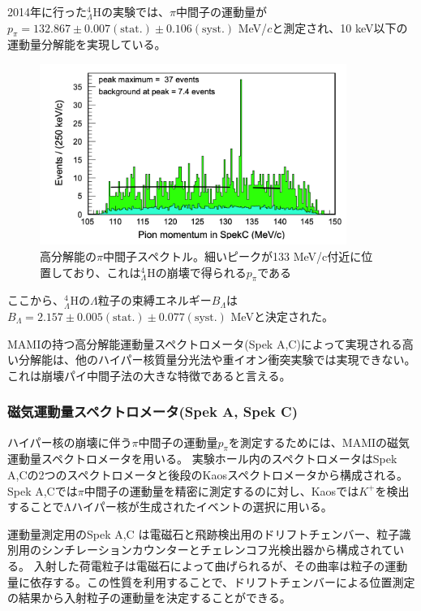 \documentclass[a4paper,11pt,uplatex]{jsbook}
\begin{document}
2014年に行った$^4_{\Lambda}\text{H}$の実験\cite{Schulz2015}では、$\pi$中間子の運動量が
$p_\pi = 132.867 \pm 0.007(\text{stat.}) \pm 0.106(\text{syst.})$ MeV/$c$と測定され、10 keV以下の運動量分解能を実現している。
\begin{figure}[b]
  \centering
  \includegraphics[width=10cm]{image/1-PionSpectrum.png}
  \caption[過去実験での$p_\pi$スペクトル]{高分解能の$\pi$中間子スペクトル。細いピークが133 MeV/c付近に位置しており、これは$^4_{\Lambda}\text{H}$の崩壊で得られる$p_\pi$である\cite{Schulz2015}}
\end{figure}

ここから、$^4_{\Lambda}\text{H}$の$\Lambda$粒子の束縛エネルギー$B_\Lambda$は$B_\Lambda = 2.157 \pm 0.005(\text{stat.}) \pm 0.077(\text{syst.})$ MeVと決定された。

MAMIの持つ高分解能運動量スペクトロメータ(Spek A,C)によって実現される高い分解能は、他のハイパー核質量分光法や重イオン衝突実験では実現できない。
これは崩壊パイ中間子法の大きな特徴であると言える。

\subsubsection{磁気運動量スペクトロメータ(Spek A, Spek C)}
ハイパー核の崩壊に伴う$\pi$中間子の運動量$p_\pi$を測定するためには、MAMIの磁気運動量スペクトロメータを用いる。
実験ホール内のスペクトロメータはSpek A,Cの2つのスペクトロメータと後段のKaosスペクトロメータから構成される。Spek A,Cでは$\pi$中間子の運動量を精密に測定するのに対し、Kaosでは$K^+$を検出することでΛハイパー核が生成されたイベントの選択に用いる。

運動量測定用のSpek A,C は電磁石と飛跡検出用のドリフトチェンバー、粒子識別用のシンチレーションカウンターとチェレンコフ光検出器から構成されている。
入射した荷電粒子は電磁石によって曲げられるが、その曲率は粒子の運動量に依存する。この性質を利用することで、ドリフトチェンバーによる位置測定の結果から入射粒子の運動量を決定することができる。
\end{document}
